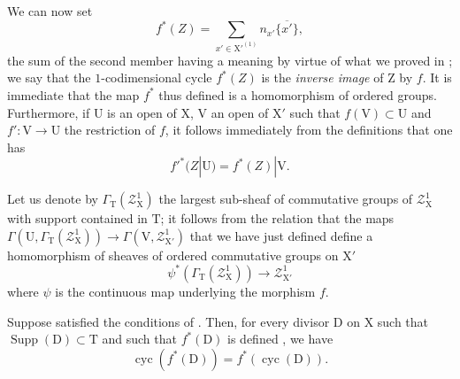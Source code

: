 \begin{env}[21.10.3]
\label{IV.21.10.3}
We can now set
\[
  f^*(Z)=\sum_{x'\in\mathrm{X}'^{(1)}} n_{x'}\overline{\{x'\}},
\]
the sum of the second member having a meaning by virtue of what we proved in ; we say that the $1$-codimensional cycle $f^*(Z)$ is the \emph{inverse image} of $\mathrm{Z}$ by $f$.
It is immediate that the map $f^*$ thus defined is a homomorphism of ordered groups.
Furthermore, if $\mathrm{U}$ is an open of $\mathrm{X}$, $\mathrm{V}$ an open of $\mathrm{X}'$ such that $f(\mathrm{V})\subset\mathrm{U}$ and $f':\mathrm{V}\to\mathrm{U}$ the restriction of $f$, it follows immediately from the definitions that one has
\[
\label{IV.21.10.3.1}
  f'^*(Z|\mathrm{U})=f^*(Z)|\mathrm{V}.
  \tag{21.10.3.1}
\]

Let us denote by $\varGamma_{\mathrm{T}}(\mathscr{Z}^1_{\mathrm{X}})$ the largest sub-sheaf of commutative groups of $\mathscr{Z}^1_{\mathrm{X}}$ with support contained in $\mathrm{T}$; it follows from the relation  that the maps $\Gamma(\mathrm{U},\varGamma_{\mathrm{T}}(\mathscr{Z}^1_{\mathrm{X}}))\to\Gamma(\mathrm{V},\mathscr{Z}^1_{\mathrm{X}'})$ that we have just defined define a homomorphism of sheaves of ordered commutative groups on $\mathrm{X}'$
\[
  \psi^*(\varGamma_{\mathrm{T}}(\mathscr{Z}^1_{\mathrm{X}}))\to\mathscr{Z}^1_{\mathrm{X}'}
\]
where $\psi$ is the continuous map underlying the morphism $f$.
\end{env}

\begin{proposition}[21.10.4]
\label{IV.21.10.4}
Suppose satisfied the conditions of .
Then, for every divisor $\mathrm{D}$ on $\mathrm{X}$ such that $\operatorname{Supp}(\mathrm{D})\subset\mathrm{T}$ and such that $f^*(\mathrm{D})$ is defined , we have
\[
\label{IV.21.10.4.1}
  \operatorname{cyc}(f^*(\mathrm{D}))=f^*(\operatorname{cyc}(\mathrm{D})).
  \tag{21.10.4.1}
\]
\end{proposition}

